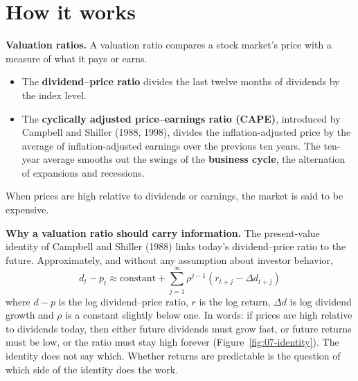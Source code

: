 \section{How it works}
\label{sec:07-how}

\textbf{Valuation ratios.} A valuation ratio compares a stock market's price with a measure of what it pays or earns.

\begin{itemize}
  \item The \textbf{dividend--price ratio} divides the last twelve months of dividends by the index level.
  \item The \textbf{cyclically adjusted price--earnings ratio (CAPE)}, introduced by Campbell and Shiller (1988, 1998), divides the inflation-adjusted price by the average of inflation-adjusted earnings over the previous ten years. The ten-year average smooths out the swings of the \textbf{business cycle}, the alternation of expansions and recessions.
\end{itemize}

When prices are high relative to dividends or earnings, the market is said to be expensive.

\textbf{Why a valuation ratio should carry information.} The present-value identity of Campbell and Shiller (1988) links today's dividend--price ratio to the future. Approximately, and without any assumption about investor behavior,
\begin{equation}
  d_t - p_t \approx \text{constant} + \sum_{j=1}^{\infty} \rho^{j-1}\left(r_{t+j} - \Delta d_{t+j}\right)
  \label{eq:07-identity}
\end{equation}
where $d - p$ is the log dividend--price ratio, $r$ is the log return, $\Delta d$ is log dividend growth and $\rho$ is a constant slightly below one. In words: if prices are high relative to dividends today, then either future dividends must grow fast, or future returns must be low, or the ratio must stay high forever (Figure~\ref{fig:07-identity}). The identity does not say which. Whether returns are predictable is the question of which side of the identity does the work.


